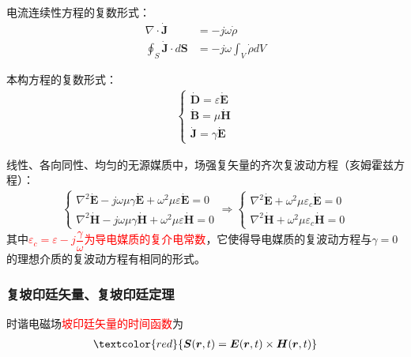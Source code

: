 \documentclass[withoutpreface,bwprint]{cumcmthesis} %
\begin{document}
电流连续性方程的复数形式：
\begin{align}
    \nabla \cdot \boldsymbol{\dot{J}} &= -j\omega \dot{\rho}\\
    \oint_S \boldsymbol{\dot{J}}\cdot d\boldsymbol{S} &= -j\omega \int_V \dot{\rho}dV
\end{align}

本构方程的复数形式：
\begin{align}
    \begin{cases}
        \boldsymbol{\dot{D}} = \varepsilon \boldsymbol{\dot{E}}\\
        \boldsymbol{\dot{B}} = \mu \boldsymbol{\dot{H}}\\
        \boldsymbol{\dot{J}} = \gamma \boldsymbol{\dot{E}}
    \end{cases}
\end{align}

线性、各向同性、均匀的无源媒质中，场强复矢量的齐次复波动方程（亥姆霍兹方程）：
\begin{align}
    \begin{cases}
        \nabla^2 \boldsymbol{\dot{E}} - j\omega \mu \gamma \boldsymbol{\dot{E}} + \omega^2 \mu \varepsilon \boldsymbol{\dot{E}} = 0 \\
        \nabla^2 \boldsymbol{\dot{H}} - j\omega \mu \gamma \boldsymbol{\dot{H}} + \omega^2 \mu \varepsilon \boldsymbol{\dot{H}} = 0
    \end{cases}
    \Rightarrow 
    \begin{cases}
        \nabla^2 \boldsymbol{\dot{E}} + \omega^2 \mu \varepsilon_c \boldsymbol{\dot{E}} = 0 \\
        \nabla^2 \boldsymbol{\dot{H}} + \omega^2 \mu \varepsilon_c \boldsymbol{\dot{H}} = 0
    \end{cases}
\end{align}
其中\textcolor{red}{$\varepsilon_c = \varepsilon - j\dfrac{\gamma}{\omega}$为导电媒质的复介电常数}，它使得导电媒质的复波动方程与$\gamma=0$的理想介质的复波动方程有相同的形式。

\subsubsection{复坡印廷矢量、复坡印廷定理}
时谐电磁场\textcolor{red}{坡印廷矢量的时间函数}为
\begin{align}
    \textcolor{red}{\boldsymbol{S}(\boldsymbol{r},t) = \boldsymbol{E}(\boldsymbol{r},t) \times \boldsymbol{H}(\boldsymbol{r},t)}
\end{align}
\end{document}
